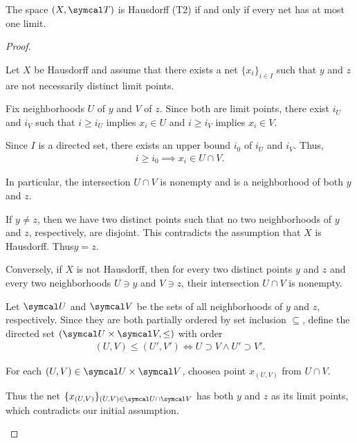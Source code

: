 \begin{proposition}\label{thm:t2_iff_singleton_limits}
  The space \( (X, \Cal{T}) \) is Hausdorff (T2) if and only if every net has at most one limit.
\end{proposition}
\begin{proof}
  \begin{description}
    \Implies Let \( X \) be Hausdorff and assume that there exists a net \( \{ x_i \}_{i \in I} \) such that \( y \) and \( z \) are not necessarily distinct limit points.

    Fix neighborhoods \( U \) of \( y \) and \( V \) of \( z \). Since both are limit points, there exist \( i_U \) and \( i_V \) such that \( i \geq i_U \) implies \( x_i \in U \) and \( i \geq i_V \) implies \( x_i \in V \).

    Since \( I \) is a directed set, there exists an upper bound \( i_0 \) of \( i_U \) and \( i_V \). Thus,
    \begin{align*}
      i \geq i_0 \implies x_i \in U \cap V.
    \end{align*}

    In particular, the intersection \( U \cap V \) is nonempty and is a neighborhood of both \( y \) and \( z \).

    If \( y \neq z \), then we have two distinct points such that no two neighborhoods of \( y \) and \( z \), respectively, are disjoint. This contradicts the assumption that \( X \) is Hausdorff. Thus\LEM \( y = z \).

    \ImpliedBy Conversely, if \( X \) is not Hausdorff\LEM, then for every two distinct points \( y \) and \( z \) and every two neighborhoods \( U \ni y \) and \( V \ni z \), their intersection \( U \cap V \) is nonempty.

    Let \( \Cal{U} \) and \( \Cal{V} \) be the sets of all neighborhoods of \( y \) and \( z \), respectively. Since they are both partially ordered by set inclusion \( \subseteq \), define the directed set \( (\Cal{U} \times \Cal{V}, \leq) \) with order
    \begin{align*}
      (U, V) \leq (U', V') \iff U \supset V \land U' \supset V'.
    \end{align*}

    For each \( (U, V) \in \Cal{U} \times \Cal{V} \), choose\AOC a point \( x_{(U, V)} \) from \( U \cap V \).

    Thus the net \( \{ x_{(U, V)} \}_{(U, V) \in \Cal{U} \cap \Cal{V}} \) has both \( y \) and \( z \) as its limit points, which contradicts our initial assumption.
  \end{description}
\end{proof}
